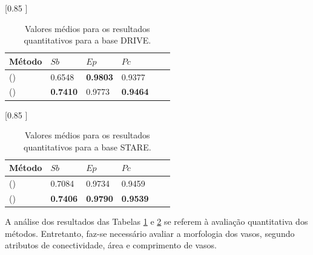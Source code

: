 \begin{table}[h]
  \caption{Valores m\'{e}dios para os resultados quantitativos para a base DRIVE.}
  \label{tabDRIVE}
  \centering
  [0.85 ]{ 
    \begin{tabular}{llllll}
      \toprule
      M\'{e}todo & $Sb$ & $Ep$ & $Pc$\\
      \midrule                 
      \citeauthor{Zana:2001} (\citeyear{Zana:2001}) &0.6548 &\textbf{0.9803} &0.9377\\

      \citeauthor{Soares:2006} (\citeyear{Soares:2006}) &\textbf{0.7410} &0.9773 &\textbf{0.9464}\\

      \bottomrule
    \end{tabular}
  }
\end{table}

\begin{table}[h]
  \caption{Valores m\'{e}dios para os resultados quantitativos para a base STARE.}
  \label{tabRESULTS}
  \centering
  [0.85 ]{ 
    \begin{tabular}{llllll}
      \toprule
      M\'{e}todo & $Sb$ & $Ep$ & $Pc$ \\
      \midrule                 
      \citeauthor{Zana:2001} (\citeyear{Zana:2001})  &0.7084 &0.9734 &0.9459 \\

      \citeauthor{Soares:2006} (\citeyear{Soares:2006})   &\textbf{0.7406} &\textbf{0.9790} & \textbf{0.9539} \\
      \bottomrule
    \end{tabular}
  }
\end{table}

A an\'{a}lise dos resultados das Tabelas \ref{tabDRIVE} e \ref{tabRESULTS} se referem \`{a} avalia\c{c}\~{a}o quantitativa dos m\'{e}todos. Entretanto, faz-se necess\'{a}rio avaliar a morfologia dos vasos, segundo atributos de conectividade, \'{a}rea e comprimento de vasos.


